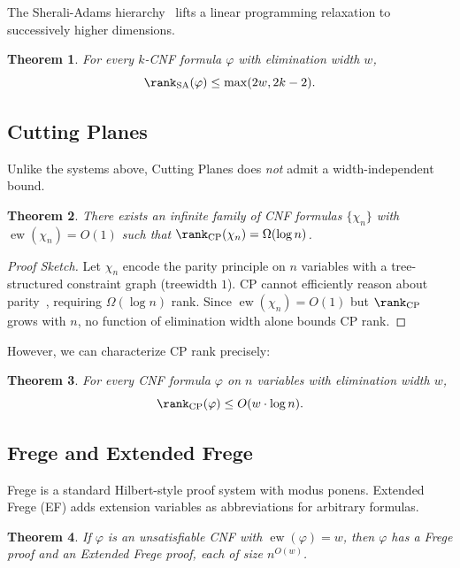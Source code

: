 \documentclass[11pt]{article}
\newtheorem{theorem}{Theorem}
\DeclareMathOperator{\ew}{ew}
\begin{document}
The Sherali-Adams hierarchy~\cite{sherali1990hierarchy} lifts a linear programming relaxation to successively higher dimensions.

\begin{theorem}
\label{thm:sa}
For every $k$-CNF formula $\varphi$ with elimination width $w$,
\[
\rank_{\mathrm{SA}}(\varphi) \leq \max(2w, 2k-2).
\]
\end{theorem}

\subsection{Cutting Planes}

Unlike the systems above, Cutting Planes does \emph{not} admit a width-independent bound.

\begin{theorem}
\label{thm:cp-lower}
There exists an infinite family of CNF formulas $\{\chi_n\}$ with $\ew(\chi_n) = O(1)$ such that $\rank_{\mathrm{CP}}(\chi_n) = \Omega(\log n)$.
\end{theorem}

\begin{proof}[Proof Sketch]
Let $\chi_n$ encode the parity principle on $n$ variables with a tree-structured constraint graph (treewidth $1$). CP cannot efficiently reason about parity~\cite{grigoriev2002complexity}, requiring $\Omega(\log n)$ rank. Since $\ew(\chi_n) = O(1)$ but $\rank_{\mathrm{CP}}$ grows with $n$, no function of elimination width alone bounds CP rank.
\end{proof}

However, we can characterize CP rank precisely:

\begin{theorem}
\label{thm:cp-upper}
For every CNF formula $\varphi$ on $n$ variables with elimination width $w$,
\[
\rank_{\mathrm{CP}}(\varphi) \leq O(w \cdot \log n).
\]
\end{theorem}

\subsection{Frege and Extended Frege}

Frege is a standard Hilbert-style proof system with modus ponens. Extended Frege (EF) adds extension variables as abbreviations for arbitrary formulas.

\begin{theorem}
\label{thm:frege}
If $\varphi$ is an unsatisfiable CNF with $\ew(\varphi) = w$, then $\varphi$ has a Frege proof and an Extended Frege proof, each of size $n^{O(w)}$.
\end{theorem}
\end{document}
